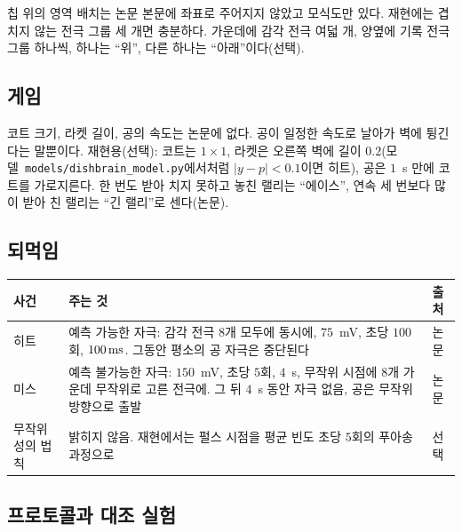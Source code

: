 칩 위의 영역 배치는 논문 본문에 좌표로 주어지지 않았고 모식도만 있다. 재현에는 겹치지 않는 전극 그룹 세 개면 충분하다. 가운데에 감각 전극 여덟 개, 양옆에 기록 전극 그룹 하나씩, 하나는 “위”, 다른 하나는 “아래”이다(선택).

\subsection*{게임}

코트 크기, 라켓 길이, 공의 속도는 논문에 없다. 공이 일정한 속도로 날아가 벽에 튕긴다는 말뿐이다. 재현용(선택): 코트는 $1\times1$, 라켓은 오른쪽 벽에 길이 $0.2$(모델~\texttt{models/dishbrain\_model.py}에서처럼 $|y-p|<0.1$이면 히트), 공은 $1$~s 만에 코트를 가로지른다. 한 번도 받아 치지 못하고 놓친 랠리는 “에이스”, 연속 세 번보다 많이 받아 친 랠리는 “긴 랠리”로 센다(논문).

\subsection*{되먹임}

\begin{center}
\footnotesize
\setlength{\tabcolsep}{4pt}
\renewcommand{\arraystretch}{1.15}
\begin{tabular}{>{\raggedright}p{2.6cm}>{\raggedright}p{8.3cm}>{\raggedright\arraybackslash}p{1.6cm}}
\toprule
사건 & 주는 것 & 출처 \\
\midrule
히트 & 예측 가능한 자극: 감각 전극 $8$개 모두에 동시에, $75$~mV, 초당 $100$회, $100\,\text{ms}$. 그동안 평소의 공 자극은 중단된다 & 논문 \\
미스 & 예측 불가능한 자극: $150$~mV, 초당 $5$회, $4$~s, 무작위 시점에 $8$개 가운데 무작위로 고른 전극에. 그 뒤 $4$~s 동안 자극 없음, 공은 무작위 방향으로 출발 & 논문 \\
무작위성의 법칙 & 밝히지 않음. 재현에서는 펄스 시점을 평균 빈도 초당 $5$회의 푸아송 과정으로 & 선택 \\
\bottomrule
\end{tabular}
\end{center}

\subsection*{프로토콜과 대조 실험}

